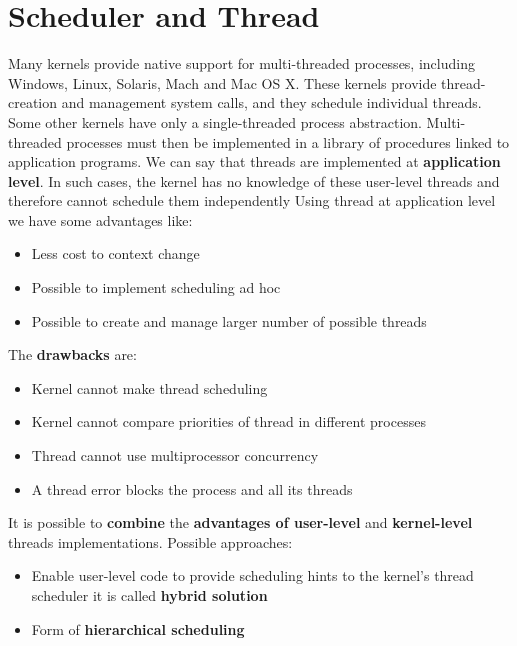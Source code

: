 \section{Scheduler and Thread}
Many kernels provide native support for multi-threaded processes, including Windows, Linux, Solaris, Mach and Mac OS X. These kernels provide thread-creation and management system calls, and they schedule individual threads. Some other kernels have only a single-threaded process abstraction. Multi-threaded processes must then be implemented in a library of procedures linked to application programs. We can say that threads are implemented at \textbf{application level}. In such cases, the kernel has no knowledge of these user-level threads and therefore cannot schedule them independently
Using thread at application level we have some advantages like:
\begin{itemize}
    \item Less cost to context change
    \item Possible to implement scheduling ad hoc
    \item Possible to create and manage larger number of possible threads
\end{itemize}
The \textbf{drawbacks} are:
\begin{itemize}
    \item Kernel cannot make thread scheduling
    \item Kernel cannot compare priorities of thread in different processes
    \item Thread cannot use multiprocessor concurrency
    \item A thread error blocks the process and all its threads
\end{itemize}
It is possible to \textbf{combine} the \textbf{advantages of user-level} and \textbf{kernel-level} threads implementations. Possible approaches:
\begin{itemize}
    \item Enable user-level code to provide scheduling hints to the kernel’s thread scheduler it is called \textbf{hybrid solution}
    \item Form of \textbf{hierarchical scheduling}
\end{itemize}


